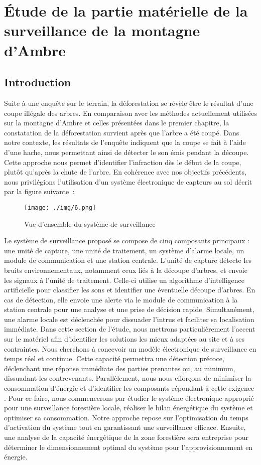\chapter{Étude de la partie matérielle de la surveillance de la montagne d’Ambre}
\section{Introduction}
Suite à une enquête sur le terrain, la déforestation se révèle être le résultat d'une coupe illégale des arbres. En comparaison avec les méthodes actuellement utilisées sur la montagne d'Ambre et celles présentées dans le premier chapitre, la constatation de la déforestation survient après que l'arbre a été coupé. Dans notre contexte, les résultats de l'enquête indiquent que la coupe se fait à l'aide d'une hache, nous permettant ainsi de détecter le son émis pendant la découpe. Cette approche nous permet d'identifier l'infraction dès le début de la coupe, plutôt qu'après la chute de l'arbre. En cohérence avec nos objectifs précédents, nous privilégions l'utilisation d'un système électronique de capteurs au sol décrit par la figure suivante :

\begin{figure}[H]
	\centering
	\texttt{[image: ./img/6.png]}
	\caption{Vue d'ensemble du système de surveillance}
\end{figure}

Le système de surveillance proposé se compose de cinq composants principaux : une unité de capture, une unité de traitement, un système d’alarme locale, un module de communication et une station centrale. L'unité de capture détecte les bruits environnementaux, notamment ceux liés à la découpe d'arbres, et envoie les signaux à l'unité de traitement. Celle-ci utilise un algorithme d'intelligence artificielle pour classifier les sons et identifier une éventuelle découpe d'arbres. En cas de détection, elle envoie une alerte via le module de communication à la station centrale pour une analyse et une prise de décision rapide. Simultanément, une alarme locale est déclenchée pour dissuader l'intrus et faciliter sa localisation immédiate. 
Dans cette section de l'étude, nous mettrons particulièrement l'accent sur le matériel afin d'identifier les solutions les mieux adaptées au site et à ses contraintes. Nous cherchons à concevoir un modèle électronique de surveillance en temps réel et continue. Cette capacité permettra une détection précoce, déclenchant une réponse immédiate des parties prenantes ou, au minimum, dissuadant les contrevenants. Parallèlement, nous nous efforçons de minimiser la consommation d'énergie et d'identifier les composants répondant à cette exigence \cite{57}.
Pour ce faire, nous commencerons par étudier le système électronique approprié pour une surveillance forestière locale, réaliser le bilan énergétique du système et optimiser sa consommation. Notre approche repose sur l'optimisation du temps d'activation du système tout en garantissant une surveillance efficace. Ensuite, une analyse de la capacité énergétique de la zone forestière sera entreprise pour déterminer le dimensionnement optimal du système pour l'approvisionnement en énergie.

